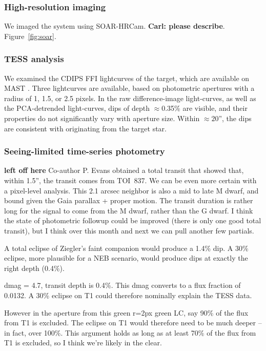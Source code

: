 \documentclass[12pt,twocolumn,tighten]{aastex62}
\newcommand{\tn}{TOI~837} %
\begin{document}
\subsubsection{High-resolution imaging}

We imaged the system using SOAR-HRCam.
{\bf Carl: please describe}.
Figure~\ref{fig:soar}.
\citet{ziegler_soar_2020}


\subsubsection{TESS analysis}

We examined the CDIPS FFI lightcurves of the target, which are
available on MAST \citep{bouma_cluster_2019}. Three lightcurves are
available, based on photometric apertures with a radius of 1, 1.5, or
2.5 pixels.  In the raw difference-image light-curves, as well as the
PCA-detrended light-curves, dips of depth $\approx$0.35\% are visible,
and their properties do not significantly vary with aperture size.
Within $\approx20$'', the dips are consistent with originating from
the target star.

\subsubsection{Seeing-limited time-series photometry}

{\bf left off here}
Co-author P{.} Evans obtained a total transit that showed that, within
1.5'', the transit comes from \tn.  We can be even more certain with a
pixel-level analysis. This 2.1 arcsec neighbor is also a mid to late M
dwarf, and bound given the Gaia parallax + proper motion. The transit
duration is rather long for the signal to come from the M dwarf,
rather than the G dwarf.  I think the state of photometric followup
could be improved (there is only one good total transit), but I think
over this month and next we can pull another few partials.

A total eclipse of Ziegler's faint companion would produce a 1.4\%
dip. A 30\% eclipse, more plausible for a NEB scenario, would produce
dips at exactly the right depth (0.4\%).

dmag = 4.7, transit depth is 0.4\%. This dmag converts to a flux
fraction of 0.0132. A 30\% eclipse on T1 could therefore nominally
explain the TESS data.  %

However in the aperture from this green r=2px green LC, say 90\% of the
flux from T1 is excluded. The eclipse on T1 would therefore need to be
much deeper -- in fact, over 100\%. This argument holds as long as at
least 70\% of the flux from T1 is excluded, so I think we're likely in
the clear.
\end{document}
